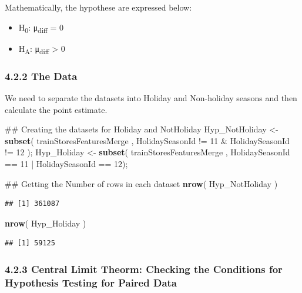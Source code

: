 \documentclass[]{article}
\newenvironment{Shaded}{\begin{snugshade}}{\end{snugshade}}
\newcommand{\KeywordTok}[1]{\textcolor[rgb]{0.13,0.29,0.53}{\textbf{{#1}}}}
\newcommand{\DecValTok}[1]{\textcolor[rgb]{0.00,0.00,0.81}{{#1}}}
\newcommand{\StringTok}[1]{\textcolor[rgb]{0.31,0.60,0.02}{{#1}}}
\newcommand{\NormalTok}[1]{{#1}}
\begin{document}
Mathematically, the hypothese are expressed below:

\begin{itemize}
\itemsep1pt\parskip0pt
\item
  H\textsubscript{0}: μ\textsubscript{diff} = 0
\item
  H\textsubscript{A}: μ\textsubscript{diff} \textgreater{} 0
\end{itemize}

\subsubsection{4.2.2 The Data}\label{the-data-1}

We need to separate the datasets into Holiday and Non-holiday seasons
and then calculate the point estimate.

\begin{Shaded}
\begin{Highlighting}[]
\NormalTok{## Creating the datasets for Holiday and NotHoliday}
\NormalTok{Hyp_NotHoliday <-}\StringTok{ }\KeywordTok{subset}\NormalTok{( trainStoresFeaturesMerge , }
                          \NormalTok{HolidaySeasonId !=}\StringTok{ }\DecValTok{11} \NormalTok{&}\StringTok{ }\NormalTok{HolidaySeasonId !=}\StringTok{ }\DecValTok{12}  \NormalTok{);}
\NormalTok{Hyp_Holiday <-}\StringTok{ }\KeywordTok{subset}\NormalTok{( trainStoresFeaturesMerge , }
                       \NormalTok{HolidaySeasonId ==}\StringTok{ }\DecValTok{11} \NormalTok{|}\StringTok{ }\NormalTok{HolidaySeasonId ==}\StringTok{ }\DecValTok{12}\NormalTok{);}

\NormalTok{## Getting the Number of rows in each dataset}
\KeywordTok{nrow}\NormalTok{( Hyp_NotHoliday )}
\end{Highlighting}
\end{Shaded}

\begin{verbatim}
## [1] 361087
\end{verbatim}

\begin{Shaded}
\begin{Highlighting}[]
\KeywordTok{nrow}\NormalTok{( Hyp_Holiday )}
\end{Highlighting}
\end{Shaded}

\begin{verbatim}
## [1] 59125
\end{verbatim}

\subsubsection{4.2.3 Central Limit Theorm: Checking the Conditions for
Hypothesis Testing for Paired
Data}\label{central-limit-theorm-checking-the-conditions-for-hypothesis-testing-for-paired-data-1}
\end{document}
